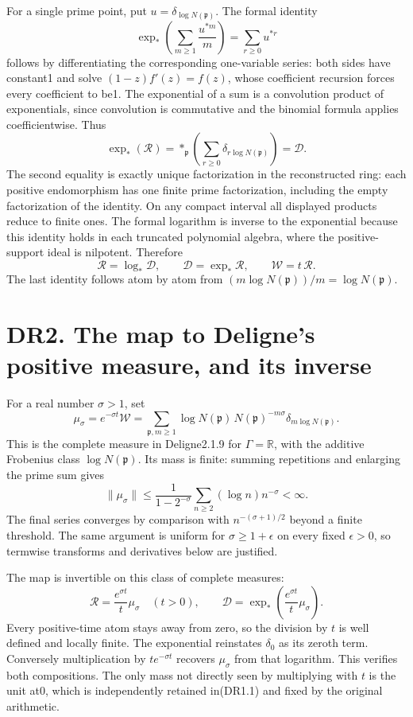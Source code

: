 \documentclass[
]{report}
\begin{document}
For a single prime point, put \(u=\delta_{\log N(\mathfrak p)}\). The
formal identity \[
\exp_*\left(\sum_{m\ge1}\frac{u^{*m}}m\right)
=\sum_{r\ge0}u^{*r}
\tag{DR1.4}
\] follows by differentiating the corresponding one-variable series:
both sides have constant1 and solve \((1-z)f'(z)=f(z)\), whose
coefficient recursion forces every coefficient to be1. The exponential
of a sum is a convolution product of exponentials, since convolution is
commutative and the binomial formula applies coefficientwise. Thus \[
\exp_*(\mathcal R)
=\mathop{*}_{\mathfrak p}\left(\sum_{r\ge0}
\delta_{r\log N(\mathfrak p)}\right)
=\mathcal D.
\tag{DR1.5}
\] The second equality is exactly unique factorization in the
reconstructed ring: each positive endomorphism has one finite prime
factorization, including the empty factorization of the identity. On any
compact interval all displayed products reduce to finite ones. The
formal logarithm is inverse to the exponential because this identity
holds in each truncated polynomial algebra, where the positive-support
ideal is nilpotent. Therefore \[
\boxed{\mathcal R=\log_*\mathcal D,\qquad
\mathcal D=\exp_*\mathcal R,\qquad
\mathcal W=t\,\mathcal R.}
\tag{DR1.6}
\] The last identity follows atom by atom from
\((m\log N(\mathfrak p))/m=\log N(\mathfrak p)\).

\section{DR2. The map to Deligne's positive measure, and its
inverse}\label{dr2.-the-map-to-delignes-positive-measure-and-its-inverse}

For a real number \(\sigma>1\), set \[
\mu_\sigma=e^{-\sigma t}\mathcal W
=\sum_{\mathfrak p,m\ge1}
\log N(\mathfrak p)\,N(\mathfrak p)^{-m\sigma}
\delta_{m\log N(\mathfrak p)}.
\tag{DR2.1}
\] This is the complete measure in Deligne2.1.9 for
\(\Gamma=\mathbb R\), with the additive Frobenius class
\(\log N(\mathfrak p)\). Its mass is finite: summing repetitions and
enlarging the prime sum gives \[
\|\mu_\sigma\|
\le\frac1{1-2^{-\sigma}}
\sum_{n\ge2}(\log n)n^{-\sigma}<\infty.
\tag{DR2.2}
\] The final series converges by comparison with \(n^{-(\sigma+1)/2}\)
beyond a finite threshold. The same argument is uniform for
\(\sigma\ge1+\epsilon\) on every fixed \(\epsilon>0\), so termwise
transforms and derivatives below are justified.

The map is invertible on this class of complete measures: \[
\boxed{\mathcal R=\frac{e^{\sigma t}}t\mu_\sigma
\quad(t>0),\qquad
\mathcal D=\exp_*\left(\frac{e^{\sigma t}}t\mu_\sigma\right).}
\tag{DR2.3}
\] Every positive-time atom stays away from zero, so the division by
\(t\) is well defined and locally finite. The exponential reinstates
\(\delta_0\) as its zeroth term. Conversely multiplication by
\(te^{-\sigma t}\) recovers \(\mu_\sigma\) from that logarithm. This
verifies both compositions. The only mass not directly seen by
multiplying with \(t\) is the unit at0, which is independently retained
in(DR1.1) and fixed by the original arithmetic.
\end{document}
